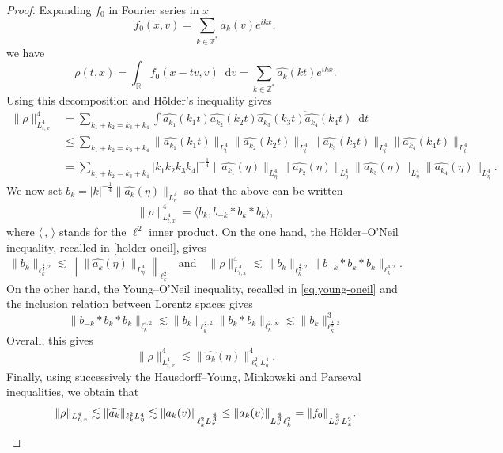 \documentclass[10pt,a4paper]{amsart}
\newcommand{\dd}{\mathop{}\!\mathrm{d}}
\begin{document}
\begin{proof} 
Expanding $f_0$ in Fourier series in $x$
\[
    f_0(x,v) = \sum_{k \in \mathbb{Z}^*}  a_k(v) e^{i k x},
\]
we have
\[
    \rho(t,x) = \int_{\mathbb{R}} f_0(x-tv,v) \dd v = \sum_{k\in\mathbb{Z}^*} \widehat{a_k}(kt) e^{i k x}.
\]
Using this decomposition and H\"older's inequality gives
\begin{align*}
    \| \rho \|_{L^4_{t,x}}^4 & = \sum_{k_1+k_2 = k_3 + k_4} \int \widehat{a_{k_1}}(k_1 t) \widehat{a_{k_2}}(k_2 t) \overline{\widehat{a_{k_3}}(k_3 t) \widehat{a_{k_4}}(k_4 t)} \dd t \\
    & \leq \sum_{k_1+k_2 = k_3 + k_4} \| \widehat{a_{k_1}}(k_1 t) \|_{L^4_t} \| \widehat{a_{k_2}}(k_2 t) \|_{L^4_t} \| \widehat{a_{k_3}}(k_3 t) \|_{L^4_t} \| \widehat{a_{k_4}}(k_4 t) \|_{L^4_t} \\
    & =  \sum_{k_1+k_2 = k_3 + k_4} |k_1 k_2 k_3 k_4|^{-\frac 14} \| \widehat{a_{k_1}}(\eta) \|_{L^4_\eta} \| \widehat{a_{k_2}}(\eta) \|_{L^4_\eta} \| \widehat{a_{k_3}}(\eta) \|_{L^4_\eta} \| \widehat{a_{k_4}}(\eta) \|_{L^4_\eta}.
\end{align*}
We now set $b_k = |k|^{-\frac 14} \| \widehat{a_k}(\eta) \|_{L^4_\eta}$ so that the above can be written
\[
    \| \rho \|_{L^4_{t,x}}^4 = \langle b_k , b_{-k} * b_k * b_k \rangle,
\]
where $\langle \,,\, \rangle$ stands for the $\ell^2$ inner product. On the one hand, the H\"older--O'Neil inequality, recalled in \eqref{holder-oneil}, gives
\[
    \| b_k \|_{\ell^{\frac 43,2}_k} \lesssim \left\| \| \widehat{a_{k}}(\eta) \|_{L^4_\eta} \right\|_{\ell^2_k} \quad \text{and} \quad
\| \rho \|_{L^4_{t,x}}^4 \lesssim \| b_k \|_{\ell^{\frac 43,2}_k} \| b_{-k} * b_k * b_k \|_{\ell^{4,2}_k}.
\]
On the other hand, the Young--O'Neil inequality, recalled in \eqref{eq.young-oneil} and the inclusion relation between Lorentz spaces gives
\[
    \| b_{-k} * b_k * b_k \|_{\ell^{4,2}_k} \lesssim \| b_k \|_{\ell^{\frac 43,2}_k} \| b_k * b_k \|_{\ell^{2,\infty}_k} \lesssim \| b_k \|_{\ell^{\frac 43,2}_k}^3
\]
Overall, this gives
\[
    \| \rho \|_{L^4_{t,x}}^4 \lesssim \| \widehat{a_{k}}(\eta) \|_{\ell^2_k L^{4}_\eta}^4.
\]
Finally, using successively the Hausdorff--Young, Minkowski and Parseval inequalities, we obtain that
\[
    \| \rho \|_{L^4_{t,x}} \lesssim  \| \widehat{a_k} \|_{\ell^2_k L^{4}_\eta} \lesssim \| a_k(v) \|_{\ell^2_k L^{\frac 43}_v} \leq \| a_k(v) \|_{L^{\frac 43}_v \ell^2_k} = \| f_0 \|_{L^{\frac 43}_v L^2_x}. \qedhere
\]
\end{proof}
\end{document}
